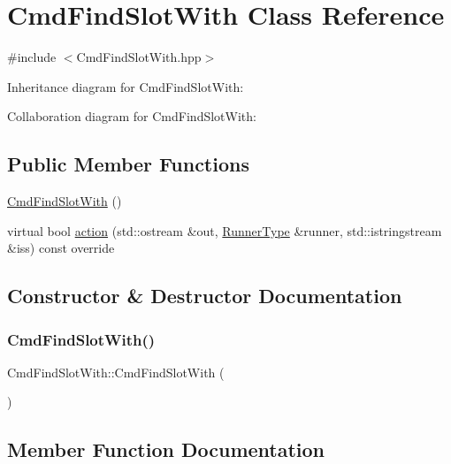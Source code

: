 \hypertarget{classCmdFindSlotWith}{}\section{Cmd\+Find\+Slot\+With Class Reference}
\label{classCmdFindSlotWith}


{\ttfamily \#include $<$Cmd\+Find\+Slot\+With.\+hpp$>$}



Inheritance diagram for Cmd\+Find\+Slot\+With\+:


Collaboration diagram for Cmd\+Find\+Slot\+With\+:
\subsection*{Public Member Functions}
\begin{DoxyCompactItemize}
\item 
\hyperlink{classCmdFindSlotWith_afdbed0612a863d8226156975adef63fe}{Cmd\+Find\+Slot\+With} ()
\item 
virtual bool \hyperlink{classCmdFindSlotWith_a0889715eef40b0c204fd97fef5050894}{action} (std\+::ostream \&out, \hyperlink{Command_8hpp_ad45c3de597c2023a8be0399d914161f4}{Runner\+Type} \&runner, std\+::istringstream \&iss) const override
\end{DoxyCompactItemize}


\subsection{Constructor \& Destructor Documentation}
\mbox{\label{classCmdFindSlotWith_afdbed0612a863d8226156975adef63fe}} 
\subsubsection{\texorpdfstring{Cmd\+Find\+Slot\+With()}{CmdFindSlotWith()}}
{\footnotesize\ttfamily Cmd\+Find\+Slot\+With\+::\+Cmd\+Find\+Slot\+With (\begin{DoxyParamCaption}{ }\end{DoxyParamCaption})}



\subsection{Member Function Documentation}
\mbox{\label{classCmdFindSlotWith_a0889715eef40b0c204fd97fef5050894}} 
